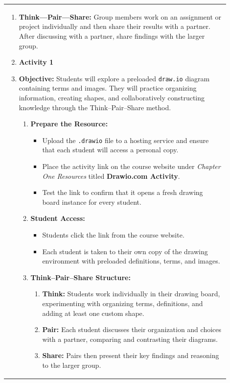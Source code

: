 \documentclass{article}
\begin{document}
\begin{tabular}{|p{0.9\linewidth}|}
\hline
\begin{enumerate}
    \item \textbf{Think---Pair---Share:} Group members work on an assignment or project individually and then share their results with a partner. After discussing with a partner, share findings with the larger group.
    \item \textbf{Activity 1}
    \item \textbf{Objective:} Students will explore a preloaded \texttt{draw.io} diagram containing terms and images. They will practice organizing information, creating shapes, and collaboratively constructing knowledge through the Think--Pair--Share method.
    \begin{enumerate}
        \item \textbf{Prepare the Resource:}
        \begin{itemize}
            \item Upload the \texttt{.drawio} file to a hosting service and ensure that each student will access a personal copy.
            \item Place the activity link on the course website under \emph{Chapter One Resources} titled \textbf{Drawio.com Activity}.
            \item Test the link to confirm that it opens a fresh drawing board instance for every student.
        \end{itemize}
    
        \item \textbf{Student Access:}
        \begin{itemize}
            \item Students click the link from the course website.
            \item Each student is taken to their own copy of the drawing environment with preloaded definitions, terms, and images.
        \end{itemize}
    
        \item \textbf{Think--Pair--Share Structure:}
        \begin{enumerate}
            \item \textbf{Think:} Students work individually in their drawing board, experimenting with organizing terms, definitions, and adding at least one custom shape.
            \item \textbf{Pair:} Each student discusses their organization and choices with a partner, comparing and contrasting their diagrams.
            \item \textbf{Share:} Pairs then present their key findings and reasoning to the larger group.
        \end{enumerate}
    

\end{enumerate}
\end{enumerate}
\end{tabular}
\end{document}
